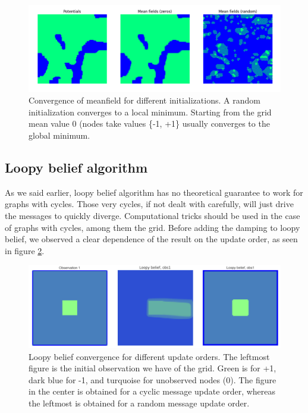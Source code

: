 \documentclass[a4paper]{article}
\begin{document}
    \begin{figure}[h]
        \centering
        \includegraphics[width = 0.732\paperwidth]{meanfield_qui_chie_a10}
        \caption{Convergence of meanfield for different initializations. A random initialization converges to a local minimum. Starting from the grid mean value 0 (nodes take values \{-1, +1\} usually converges to the global minimum.}
        \label{figure:meanfieldconvprob}
    \end{figure}
    
    
    
    \subsection{Loopy belief algorithm}
    As we said earlier, loopy belief algorithm has no theoretical guarantee to work for graphs with cycles. Those very cycles, if not dealt with carefully, will just drive the messages to quickly diverge. Computational tricks should be used in the case of graphs with cycles, among them the grid. 
    Before adding the damping to loopy belief, we observed a clear dependence of the result on the update order, as seen in figure \ref{figure:lbupdateorder}.
    
    \begin{figure}[h]
        \centering
        \includegraphics[width=0.72\paperwidth]{lb_before_damping}
        \caption{Loopy belief convergence for different update orders. The leftmost figure is the initial observation we have of the grid. Green is for +1, dark blue for -1, and turquoise for unobserved nodes (0). The figure in the center is obtained for a cyclic message update order, whereas the leftmost is obtained for a random message update order.}
        \label{figure:lbupdateorder}
    \end{figure}
    
\end{document}
